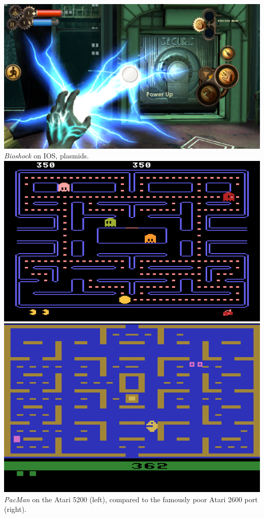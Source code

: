 \documentclass{scrartcl}
\begin{document}
{\includegraphics[scale = 0.3]{Bioshock_IOS_Plasmid}\\{
    \emph{Bioshock} on IOS, plasmids.
}\\

\includegraphics[scale = 0.3]{PacMan_Original}
\includegraphics[scale = 0.285]{PacMan_(1982)_Atari_Port}{
    \emph{PacMan} on the Atari 5200 (left), compared to the famously poor Atari 2600 port (right).
}

}
\end{document}
